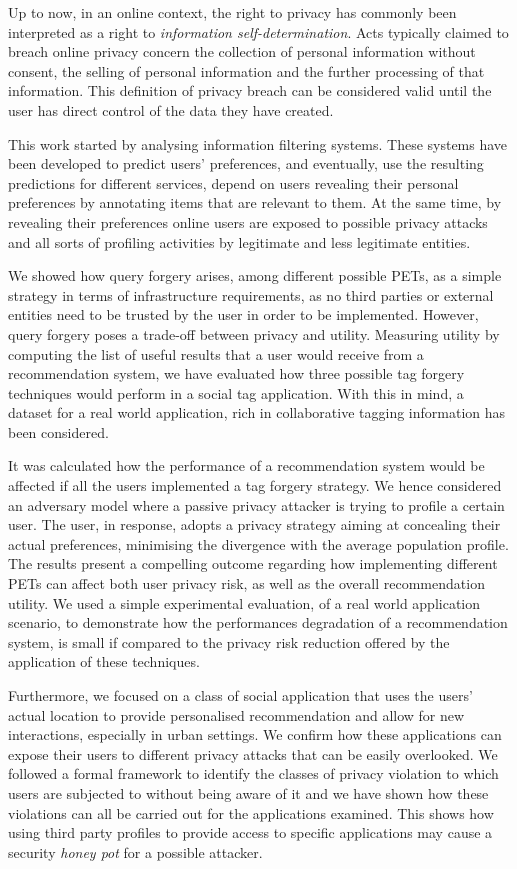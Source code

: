Up to now, in an online context, the right to privacy has commonly been interpreted as a right to \emph{information self-determination}. Acts typically claimed to breach online privacy concern the collection of personal information without consent, the selling of personal information and the further processing of that information. This definition of privacy breach can be considered valid until the user has direct control of the data they have created.

This work started by analysing information filtering systems. These systems have been developed to predict users' preferences, and eventually, use the resulting predictions for different services, depend on users revealing their personal preferences by annotating items that are relevant to them.  At the same time, by revealing their preferences online users are exposed to possible privacy attacks and all sorts of profiling activities by legitimate and less legitimate entities.

We showed how query forgery arises, among different possible PETs, as a simple strategy in terms of infrastructure requirements, as no third parties or external entities need to be trusted by the user in order to be implemented. However, query forgery poses a trade-off between privacy and utility. Measuring utility by computing the list of useful results that a user would receive from a recommendation system, we have evaluated how three possible tag forgery techniques would perform in a social tag application. With this in mind, a dataset for a real world application, rich in collaborative tagging information has been considered.

It was calculated how the performance of a recommendation system would be affected if all the users implemented a tag forgery strategy. We hence considered an adversary model where a passive privacy attacker is trying to profile a certain user. The user, in response, adopts a privacy strategy aiming at concealing their actual preferences, minimising the divergence with the average population profile. The results present a compelling outcome regarding how implementing different PETs can affect both user privacy risk, as well as the overall recommendation utility. We used a simple experimental evaluation, of a real world application scenario, to demonstrate how the performances degradation of a recommendation system, is small if compared to the privacy risk reduction offered by the application of these techniques.

Furthermore, we focused on a class of social application that uses the users' actual location to provide personalised recommendation and allow for new interactions, especially in urban settings. We confirm how these applications can expose their users to different privacy attacks that can be easily overlooked. We followed a formal framework to identify the classes of privacy violation to which users are subjected to without being aware of it and we have shown how these violations can all be carried out for the applications examined. This shows how using third party profiles to provide access to specific applications may cause a security \emph{honey pot} for a possible attacker.

